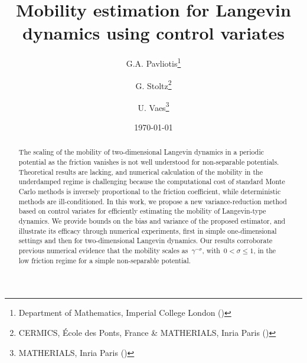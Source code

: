 \documentclass[11pt,a4paper]{article}
\date{\today}
\title{Mobility estimation for Langevin dynamics using control variates}
\author{%
  G.A. Pavliotis\thanks{Department of Mathematics, Imperial College London (\email{g.pavliotis@imperial.ac.uk})}%
  \hspace{2mm}\orcid{0000-0002-3468-9227}%
  \and G. Stoltz\thanks{CERMICS, \'Ecole des Ponts, France \& MATHERIALS, Inria Paris (\email{gabriel.stoltz@enpc.fr})}
  \hspace{2mm}\orcid{0000-0002-2797-5938}%
  \and U. Vaes\thanks{MATHERIALS, Inria Paris (\email{urbain.vaes@inria.fr})}%
  \hspace{2mm}\orcid{0000-0002-7629-7184}
}
\begin{document}
\maketitle

\begin{abstract}
    The scaling of the mobility of two-dimensional Langevin dynamics in a periodic potential as the friction vanishes is not well understood for non-separable potentials.
    Theoretical results are lacking,
    and numerical calculation of the mobility in the underdamped regime is challenging because
    the computational cost of standard Monte Carlo methods is inversely proportional to the friction coefficient,
    while deterministic methods are ill-conditioned.
    In this work, we propose a new variance-reduction method based on control variates for efficiently estimating the mobility of Langevin-type dynamics.
    We provide bounds on the bias and variance of the proposed estimator,
    and illustrate its efficacy through numerical experiments,
    first in simple one-dimensional settings
    and then for two-dimensional Langevin dynamics.
    Our results corroborate previous numerical evidence that
    the mobility scales as~$\gamma^{-\sigma}$, with~$0 < \sigma \leq 1$,
    in the low friction regime for a simple non-separable potential.
\end{abstract}

\end{document}
